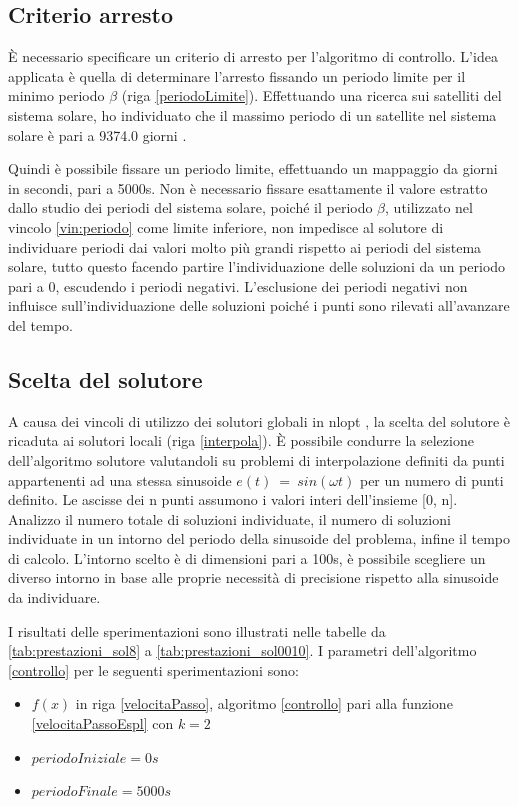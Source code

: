\documentclass[a4paper,12pt]{report}
\begin{document}
\subsection{Criterio arresto }
\label{ss:arresto}
È necessario specificare un criterio di arresto per l'algoritmo di controllo. L'idea applicata è quella di determinare l'arresto fissando un periodo limite per il minimo periodo $ \beta $ (riga \ref{periodoLimite}). Effettuando una ricerca sui satelliti del sistema solare, ho individuato che il massimo periodo di un satellite nel sistema solare è pari a 9374.0 giorni \cite{nasa}.

Quindi è possibile fissare un periodo limite, effettuando un mappaggio da giorni in secondi, pari a 5000s.
Non è necessario fissare esattamente il valore estratto dallo studio dei periodi del sistema solare, poiché il periodo $ \beta $, utilizzato nel vincolo \eqref{vin:periodo}  come limite inferiore, non impedisce al solutore di individuare periodi dai valori molto più grandi rispetto ai periodi del sistema solare, tutto questo facendo partire l'individuazione delle soluzioni da un periodo pari a 0, escudendo i periodi negativi. L'esclusione dei periodi negativi non influisce sull'individuazione delle soluzioni poiché i punti sono rilevati all'avanzare del tempo.

\subsection{Scelta del solutore}
\label{ss:scelta_solutore}
A causa dei vincoli di utilizzo dei solutori globali in nlopt \cite{nlopt}, la scelta del solutore è ricaduta ai solutori locali (riga \ref{interpola}). È possibile condurre la selezione dell'algoritmo solutore valutandoli su problemi di interpolazione definiti da punti appartenenti ad una stessa sinusoide $ e(t)~=~sin(\omega t)$ per un numero di punti definito. Le ascisse dei n punti assumono i valori interi dell'insieme [0, n]. Analizzo il numero totale di soluzioni individuate, il numero di soluzioni individuate in un intorno del periodo della sinusoide del problema, infine il tempo di calcolo.
L'intorno scelto è di dimensioni pari a 100s, è possibile scegliere un diverso intorno in base alle proprie necessità di precisione rispetto alla sinusoide da individuare.

I risultati delle sperimentazioni sono illustrati nelle tabelle da \ref{tab:prestazioni_sol8} a \ref{tab:prestazioni_sol0010}.
I parametri dell'algoritmo \ref{controllo} per le seguenti sperimentazioni sono:
\begin{itemize}
  \item $f(x)$ in riga \ref{velocitaPasso}, algoritmo \ref{controllo} pari alla funzione \eqref{velocitaPassoEspl} con $k = 2$
  \item $periodoIniziale = 0s$
  \item $periodoFinale = 5000s$
\end{itemize}
\end{document}
